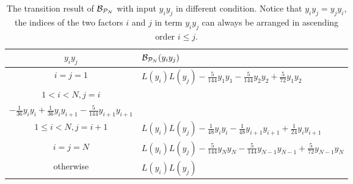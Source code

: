\documentclass[journal=jctcce,a4paper,manuscript=article]{achemso}
\begin{document}
\begin{table}
  \centering
  \renewcommand\arraystretch{2}
  \begin{tabular}{|c|l|}
    \hline$y_i y_j$            & $ \mathcal{B}_{\mathcal{P}_N} (y_i y_j) $                                                                                           \\
    \hline$i=j=1$              & $L(y_i)L(y_j) -\frac{5}{144} y_1 y_1-\frac{5}{144} y_2 y_2+\frac{5}{72} y_1 y_2$                              \\
    \hline $1<i<N, j=i$        & \makecell{$L(y_i)L(y_j)-\frac{5}{144} y_{i-1} y_{i-1}+\frac{1}{36} y_{i-1} y_i +\frac{1}{24} y_{i-1} y_{i+1}$ \\$ -\frac{1}{36} y_i y_i+\frac{1}{36} y_i y_{i+1}-\frac{5}{144} y_{i+1} y_{i+1}$} \\
    \hline $1 \leq i<N, j=i+1$ & $L(y_i)L(y_j)-\frac{1}{48} y_i y_i-\frac{1}{48} y_{i+1} y_{i+1}+\frac{1}{24} y_i y_{i+1}$                     \\
    \hline$i=j=N$              & $L(y_i)L(y_j)-\frac{5}{144} y_N y_N-\frac{5}{144} y_{N-1} y_{N-1}+\frac{5}{72} y_{N-1} y_N$                   \\
    \hline otherwise           & $L(y_i)L(y_j)$                                                                                                \\
    \hline
  \end{tabular}
  \caption{The transition result of $\mathcal{B}_{\mathcal{P}_N}$ with input $y_iy_j$ in different condition. Notice that $y_i y_j = y_j y_i$, the indices of the two factors $i$ and $j$ in term $y_iy_j$ can always be arranged in ascending order $i\leq j$.}
  \label{table: transition table of teto}
\end{table}
\end{document}
